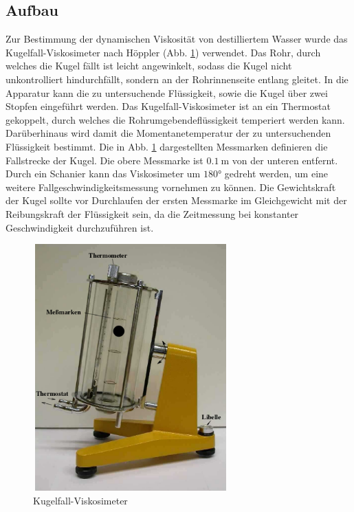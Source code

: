 \subsection{Aufbau}

Zur Bestimmung der dynamischen Viskosität von destilliertem Wasser wurde das Kugelfall-Viskosimeter nach Höppler (Abb. \ref{fig:Aufbau}) verwendet.
Das Rohr, durch welches die Kugel fällt ist leicht angewinkelt, sodass die Kugel nicht unkontrolliert hindurchfällt, sondern an der Rohrinnenseite
entlang gleitet.
In die Apparatur kann die zu untersuchende Flüssigkeit, sowie die Kugel über zwei Stopfen eingeführt werden. Das Kugelfall-Viskosimeter ist an ein Thermostat
gekoppelt, durch welches die Rohrumgebendeflüssigkeit temperiert werden kann. Darüberhinaus wird damit die Momentanetemperatur der zu untersuchenden
Flüssigkeit bestimmt. Die in Abb. \ref{fig:Aufbau} dargestellten Messmarken definieren die Fallstrecke der Kugel. Die obere Messmarke ist
$\SI{0,1}{\meter}$ von der unteren entfernt.
Durch ein Schanier kann das Viskosimeter um $\ang{180}$ gedreht werden, um eine weitere Fallgeschwindigkeitsmessung vornehmen zu können.
Die Gewichtskraft der Kugel sollte vor Durchlaufen der ersten Messmarke im Gleichgewicht mit der Reibungskraft der Flüssigkeit sein, da die Zeitmessung
bei konstanter Geschwindigkeit durchzuführen ist.

\begin{figure}
  \centering
  \includegraphics[width=7.50cm, height=9.50cm]{V207_Kugelfall-Viskosimeter_Hoeppler.png}
  \caption{Kugelfall-Viskosimeter\cite{anleitung01}}
  \label{fig:Aufbau}
\end{figure}



\newpage

\nocite{*}
\printbibliography

